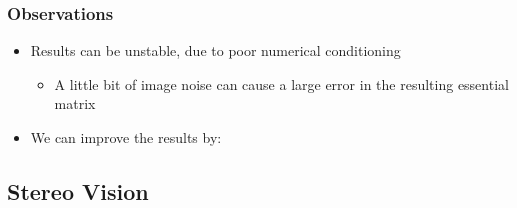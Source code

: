 \documentclass[11pt,letterpaper]{article}
\begin{document}
\subsubsection{Observations}
\begin{itemize}
\item Results can be unstable, due to poor numerical conditioning
\begin{itemize}
\item A little bit of image noise can cause a large error in the resulting essential matrix
\end{itemize}
\item We can improve the results by:
\end{itemize}
\subsection{Stereo Vision}
\end{document}
